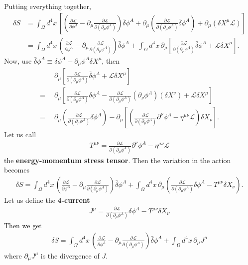 \documentclass[a4paper,11pt]{article}
\numberwithin{equation}{section}
\theoremstyle{definition}
\newcommand{\p}{\partial}
\newcommand{\lag}{\mathcal{L}}
\newcommand{\nn}{\nonumber}
\begin{document}
Putting everything together,
\begin{align}
\delta S &= \int_\Omega d^4x\,\left[\left(\frac{\p \lag}{\p \phi^A} - \p_\mu \frac{\p \lag}{\p( \p_\mu\phi^A)}\right)\bar{\delta}\phi^A + \p_\mu \left(\frac{\p \lag}{\p(\p_\mu\phi^A)}\bar{\delta}\phi^A\right) +  \p_\mu \left(\delta X^\mu \lag\right)\right]\nn\\
&= \int_\Omega d^4x\, \left(\frac{\p \lag}{\p \phi^A} - \p_\mu \frac{\p \lag}{\p( \p_\mu\phi^A)}\right)\bar{\delta}\phi^A + \int_\Omega d^4x\, \p_\mu\left[\frac{\p \lag}{\p( \p_\mu \phi^A)} \bar{\delta}\phi^A + \lag \delta X^\mu\right].
\end{align}
Now, use $\bar{\delta}\phi^A \equiv \delta \phi^A - \p_\mu \phi^A \delta X^\mu$, then
\begin{align}
&\p_\mu\left[\frac{\p \lag}{\p( \p_\mu \phi^A)} \bar{\delta}\phi^A + \lag \delta X^\mu\right]\nn\\
=\,\,\, & \p_\mu \left[ \frac{\p \lag}{\p( \p_\mu\phi^A)}\delta \phi^A - \frac{\p \lag}{\p( \p_\mu \phi^A)}(\p_\nu \phi^A)( \delta X^\nu) + \lag \delta X^\mu\right]\nn\\
=\,\,\, & \p_\mu \left(\frac{\p \lag}{\p( \p_\mu\phi^A)}\delta \phi^A \right) - \p_\mu\left[\left(\frac{\p \lag}{\p( \p_\mu \phi^A)}\p^\nu\phi^A - \eta^{\mu\nu}\lag\right)\delta X_\nu\right].
\end{align}
Let us call
\begin{align}
\boxed{T^{\mu\nu} = \frac{\p \lag}{\p( \p_\mu\phi^A)}\p^\nu\phi^A - \eta^{\mu\nu}\lag}
\end{align}
the \textbf{energy-momentum stress tensor}. Then the variation in the action becomes
\begin{align}
\delta S = \int_\Omega d^4x\,\left(\frac{\p \lag}{\p \phi^A} - \p_\mu\frac{\p \lag}{\p( \p_\mu\phi^A)}\right)\bar{\delta}\phi^A + \int_\Omega d^4x\, \p_\mu\left(\frac{\p \lag}{\p( \p_\mu\phi^A)}\delta \phi^A - T^{\mu\nu}\delta X_\nu\right).
\end{align}
Let us define the \textbf{4-current}
\begin{align}
\boxed{J^\mu = \frac{\p \lag}{\p( \p_\mu\phi^A)}\delta \phi^A - T^{\mu\nu}\delta X_\nu}
\end{align}
Then we get
\begin{align}
\boxed{\delta S = \int_\Omega d^4x\,\left(\frac{\p \lag}{\p \phi^A} - \p_\mu\frac{\p \lag}{\p( \p_\mu\phi^A)}\right)\bar{\delta}\phi^A
+ \int_\Omega d^4x\,\p_\mu J^\mu}
\end{align}
where $\p_\mu J^\mu$ is the divergence of $J$. \\
\end{document}
